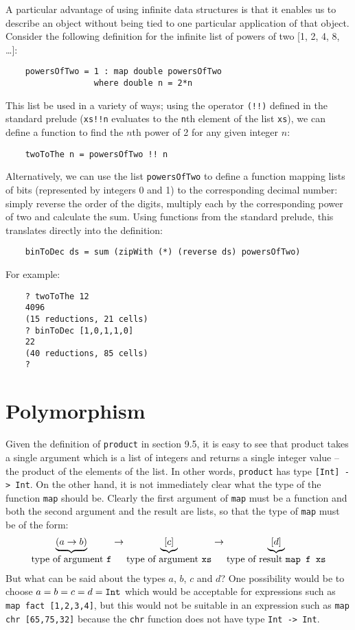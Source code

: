 A particular advantage of using infinite data  structures  is  that  it
enables us to describe an object without being tied to  one  particular
application of that object.  Consider the following definition for  the
infinite list of powers of two [1, 2, 4, 8, \dots]:
\begin{verbatim}
    powersOfTwo = 1 : map double powersOfTwo 
                  where double n = 2*n
\end{verbatim}
This list be used in a variety of ways; using the operator \verb"(!!)" defined
in the standard prelude (\verb"xs!!n" evaluates to the \verb"n"th
element of the list
\verb"xs"), we can define a function to find the $n$th power of 2 for  
any given
integer $n$:
\begin{verbatim}
    twoToThe n = powersOfTwo !! n 
\end{verbatim}
Alternatively, we can use the list \verb"powersOfTwo" to define  a  function
mapping lists of  bits  (represented  by  integers  0  and  1)  to  the
corresponding decimal number: simply reverse the order of  the  digits,
multiply each by the corresponding power of two and calculate the  sum.
Using functions from the standard  prelude,  this  translates  directly
into the definition:
\begin{verbatim}
    binToDec ds = sum (zipWith (*) (reverse ds) powersOfTwo)
\end{verbatim}
For example:
\begin{verbatim}
    ? twoToThe 12
    4096
    (15 reductions, 21 cells)
    ? binToDec [1,0,1,1,0]
    22
    (40 reductions, 85 cells)
    ?
\end{verbatim}

\section{Polymorphism}
Given the definition of \verb"product" in section 9.5, it  is  easy  to  see
that product takes a single argument which is a list  of  integers  and
returns a single integer value -- the product of the  elements  of  the
list.  In other words, \verb"product" has type \verb"[Int] -> Int".
On  the  other
hand, it is not immediately clear what the type of the  function  \verb"map"
should be.  Clearly the first argument of \verb"map" must be a function  and
both the second argument and the result are lists, so that the type  of
\verb"map" must be of the form:
\[
               \underbrace{(a\to b)}_{\mbox{type of argument {\tt f}}}
            \to\underbrace{[c]}_{\mbox{type of argument {\tt xs}}}
            \to\underbrace{[d]}_{\mbox{type of result {\tt map f xs}}}
\]
But what can be said about the types $a$, $b$, $c$ and  $d$?   One  possibility
would be to choose $a = b = c = d = \mbox{{\tt Int}}$ which would  be  acceptable  for
expressions such as  \verb"map fact [1,2,3,4]",  but  this  would  not  be
suitable in an expression such as  \verb"map chr [65,75,32]"  because  the
\verb"chr" function does not have type \verb"Int -> Int".

